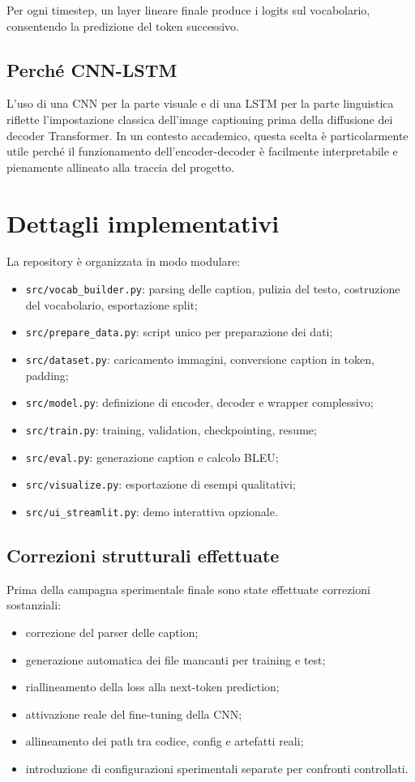 \documentclass[12pt,a4paper]{article}
\begin{document}
Per ogni timestep, un layer lineare finale produce i logits sul vocabolario, consentendo la predizione del token successivo.

\subsection{Perché CNN-LSTM}

L'uso di una CNN per la parte visuale e di una LSTM per la parte linguistica riflette l'impostazione classica dell'image captioning prima della diffusione dei decoder Transformer. In un contesto accademico, questa scelta è particolarmente utile perché il funzionamento dell'encoder-decoder è facilmente interpretabile e pienamente allineato alla traccia del progetto.

\section{Dettagli implementativi}

La repository è organizzata in modo modulare:
\begin{itemize}[leftmargin=*]
    \item \texttt{src/vocab\_builder.py}: parsing delle caption, pulizia del testo, costruzione del vocabolario, esportazione split;
    \item \texttt{src/prepare\_data.py}: script unico per preparazione dei dati;
    \item \texttt{src/dataset.py}: caricamento immagini, conversione caption in token, padding;
    \item \texttt{src/model.py}: definizione di encoder, decoder e wrapper complessivo;
    \item \texttt{src/train.py}: training, validation, checkpointing, resume;
    \item \texttt{src/eval.py}: generazione caption e calcolo BLEU;
    \item \texttt{src/visualize.py}: esportazione di esempi qualitativi;
    \item \texttt{src/ui\_streamlit.py}: demo interattiva opzionale.
\end{itemize}

\subsection{Correzioni strutturali effettuate}

Prima della campagna sperimentale finale sono state effettuate correzioni sostanziali:
\begin{itemize}[leftmargin=*]
    \item correzione del parser delle caption;
    \item generazione automatica dei file mancanti per training e test;
    \item riallineamento della loss alla next-token prediction;
    \item attivazione reale del fine-tuning della CNN;
    \item allineamento dei path tra codice, config e artefatti reali;
    \item introduzione di configurazioni sperimentali separate per confronti controllati.
\end{itemize}
\end{document}
